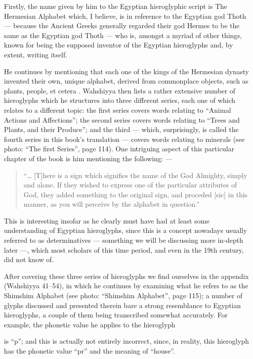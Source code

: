 \documentclass[a5paper,twoside,11pt]{report}
\begin{document}
	Firstly, the name given by him to the Egyptian hieroglyphic script is The Hermesian Alphabet \parencite[p. 14]{wahshiyya} which, I believe, is in reference to the Egyptian god Thoth — because the Ancient Greeks generally regarded their god Hermes to be the same as the Egyptian god Thoth — who is, amongst a myriad of other things, known for being the supposed inventor of the Egyptian hieroglyphs and, by extent, writing itself.

	He continues by mentioning that each one of the kings of the Hermesian dynasty invented their own, unique alphabet, derived from commonplace objects, such as plants, people, et cetera \parencite[pp. 14-15]{wahshiyya}. Wahshiyya then lists a rather extensive number of hieroglyphs which he structures into three different series, each one of which relates to a different topic: the first series covers words relating to “Animal Actions and Affections”; the second series covers words relating to “Trees and Plants, and their Produce”; and the third — which, surprisingly, is called the fourth series in this book’s translation — covers words relating to minerals (see photo: “The first Series”, page 114). \parencite[pp. 19-40]{wahshiyya}
	One intriguing aspect of this particular chapter of the book is him mentioning the following: —

	\begin{quote}“… [T]here is a sign which signifies the name of the God Almighty, simply and alone. If they wished to express one of the particular attributes of God, they added something to the original sign, and proceded [sic] in this manner, as you will perceive by the alphabet in question.” \parencite[p. 16]{wahshiyya}\end{quote}

	This is interesting insofar as he clearly must have had at least some understanding of Egyptian hieroglyphs, since this is a concept nowadays usually referred to as determinatives — something we will be discussing more in-depth later —, which most scholars of this time period, and even in the 19th century, did not know of.

	After covering these three series of hieroglyphs we find ourselves in the appendix (Wahshiyya 41–54), in which he continues by examining what he refers to as the Shimshim Alphabet (see photo: “Shimshim Alphabet”, page 115); a number of glyphs discussed and presented therein bare a strong resemblance to Egyptian hieroglyphs, a couple of them being transcribed somewhat accurately. For example, the phonetic value he applies to the hieroglyph \begin{hieroglyph}{\leavevmode {}}\end{hieroglyph} is “p”; and this is actually not entirely incorrect, since, in reality, this hieroglyph has the phonetic value “pr” and the meaning of “house”.
\end{document}
